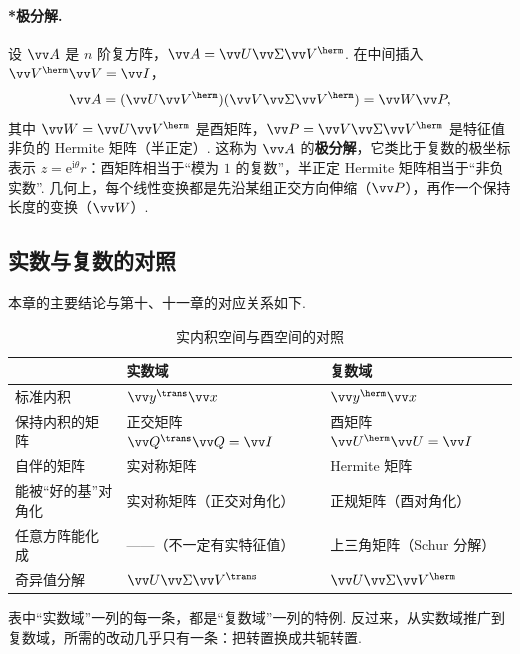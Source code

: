 	\paragraph*{*极分解.} 设 $\vv A$ 是 $n$ 阶复方阵，$\vv A=\vv U\vv\Sigma\vv V^\herm$. 在中间插入 $\vv V^\herm\vv V=\vv I$，
	\[\vv A=(\vv U\vv V^\herm)(\vv V\vv\Sigma\vv V^\herm)=\vv W\vv P,\]
	其中 $\vv W=\vv U\vv V^\herm$ 是酉矩阵，$\vv P=\vv V\vv\Sigma\vv V^\herm$ 是特征值非负的 Hermite 矩阵（半正定）. 这称为 $\vv A$ 的\textbf{极分解}，它类比于复数的极坐标表示 $z=\mathrm e^{\mathrm i\theta}r$：酉矩阵相当于“模为 $1$ 的复数”，半正定 Hermite 矩阵相当于“非负实数”. 几何上，每个线性变换都是先沿某组正交方向伸缩（$\vv P$），再作一个保持长度的变换（$\vv W$）.
	
	\subsection{实数与复数的对照}
	
	本章的主要结论与第十、十一章的对应关系如下.
	\begin{table}[htbp]
		\centering
		\begin{tabular}{lll}
			\toprule
			& 实数域 & 复数域 \\
			\midrule
			标准内积 & $\vv y^\trans\vv x$ & $\vv y^\herm\vv x$ \\
			保持内积的矩阵 & 正交矩阵 $\vv Q^\trans\vv Q=\vv I$ & 酉矩阵 $\vv U^\herm\vv U=\vv I$ \\
			自伴的矩阵 & 实对称矩阵 & Hermite 矩阵 \\
			能被“好的基”对角化 & 实对称矩阵（正交对角化） & 正规矩阵（酉对角化） \\
			任意方阵能化成 & ——（不一定有实特征值） & 上三角矩阵（Schur 分解） \\
			奇异值分解 & $\vv U\vv\Sigma\vv V^\trans$ & $\vv U\vv\Sigma\vv V^\herm$ \\
			\bottomrule
		\end{tabular}
		\caption{实内积空间与酉空间的对照}
		\label{tab:realcomplex}
	\end{table}
	
	表中“实数域”一列的每一条，都是“复数域”一列的特例. 反过来，从实数域推广到复数域，所需的改动几乎只有一条：把转置换成共轭转置.
	
